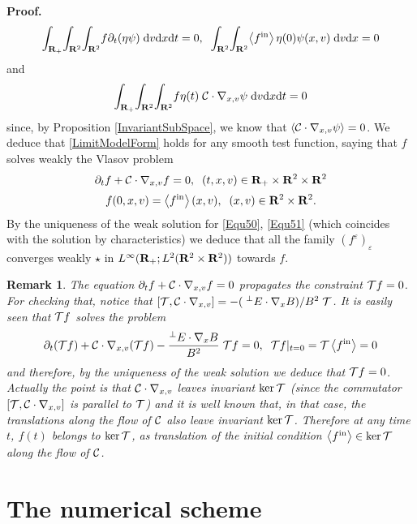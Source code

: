 \documentclass[12pt, a4paper]{article}
\providecommand\mathbb{\bf}
\newcommand\R{{\mathbb R}}
\newtheorem{remark}{Remark}[section]
\newcounter{Remark}
\newcounter{steps}
\newenvironment{proof}[1][]{%
\par\medbreak\setcounter{steps}{0}
{\noindent\bfseries Proof#1. }} {\hfill\fbox{\ }\medbreak}
\newcommand{\intxv}[1]{
\int _{\R^2}\!\int _{\R^2} \!#1 \;\mathrm{d}v\mathrm{d}x}
\newcommand{\inttxv}[1]{
\int _{\R_+} \! \int _{\R^2}\!\int _{\R^2} \!#1 \;\mathrm{d}v\mathrm{d}x\mathrm{d}t}
\newcommand{\eps}[0]{
\varepsilon}
\newcommand{\fe}[0]{
f ^\varepsilon}
\newcommand{\fin}[0]{
f ^{\mathrm{in}}}
\newcommand{\ltxv}[0]{
L^2(\R ^2 \times \R ^2)}
\newcommand{\nxv}[0]{
\nabla_{x,v}}
\newcommand{\ave}[1]{
\left \langle #1 \right \rangle }
\begin{document}
\begin{proof}
\[
\inttxv{f \partial _t ( \eta \psi ) } = 0,\;\;\intxv{\ave{\fin} \eta (0) \psi (x,v)} = 0
\]
and
\[
\inttxv{f \eta (t)\; {\cal C}\cdot \nxv \psi } = 0
\]
since, by Proposition \ref{InvariantSubSpace}, we know that $\ave{{\cal C}\cdot \nxv \psi} = 0$. We deduce that \eqref{LimitModelForm} holds for any smooth test function, saying that $f$ solves weakly the Vlasov problem
\begin{equation}
\label{Equ50} \partial _t f + {\cal C} \cdot \nxv f = 0,\;\;(t,x,v) \in \R_+ \times \R ^2 \times \R ^2
\end{equation}
\begin{equation}
\label{Equ51} f(0,x,v) = \ave{\fin}(x,v),\;\;(x,v) \in \R ^2 \times \R^2.
\end{equation}
By the uniqueness of the weak solution for \eqref{Equ50}, \eqref{Equ51} (which coincides with the solution by characteristics) we deduce that all the family $(\fe)_\eps$ converges weakly $\star$ in $L^\infty( \R_+;\ltxv{})$ towards $f$. 
\end{proof}
\begin{remark}
\label{ConstraintPropag} The equation $\partial _t f + {\cal C} \cdot \nxv f = 0$ propagates the constraint ${\cal T} f = 0$. For checking that, notice that $[{\cal T}, {\cal C} \cdot \nxv ] = - (\;^\perp E \cdot \nabla _x B)/B^2 \;{\cal T}$. It is easily seen that ${\cal T}f$ solves the problem
\[
\partial _t ({\cal T}f) + {\cal C} \cdot \nxv ({\cal T}f) - \frac{^\perp E \cdot \nabla _x B}{B^2} \;{\cal T}f = 0,\;\;{\cal T}f |_{t = 0} = {\cal T}\ave{\fin} = 0
\]
and therefore, by the uniqueness of the weak solution we deduce that ${\cal T}f = 0$. Actually the point is that ${\cal C}\cdot \nxv $ leaves invariant $\ker {\cal T}$ (since the commutator $[{\cal T}, {\cal C}\cdot \nxv]$ is parallel to ${\cal T}$) and it is well known that, in that case, the translations along the flow of ${\cal C}$ also leave invariant $\ker {\cal T}$. Therefore at any time $t$, $f(t)$ belongs to $\ker {\cal T}$, as translation of the initial condition $\ave{\fin} \in \ker {\cal T}$ along the flow of ${\cal C}$. 
\end{remark}

\section{The numerical scheme}
\label{NumSch}
\end{document}
